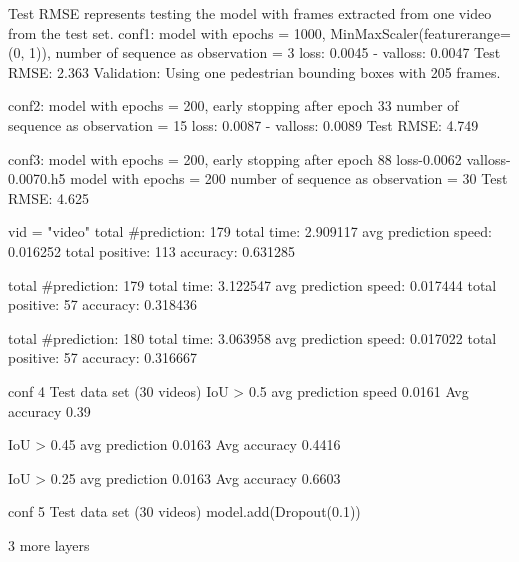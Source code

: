 Test RMSE represents testing the model with frames extracted from one video from the test set.
conf1: model with epochs = 1000, MinMaxScaler(feature\textunderscore range=(0, 1)), 
number of sequence as observation = 3
loss: 0.0045 - val\textunderscore loss: 0.0047 
Test RMSE: 2.363
Validation: Using one pedestrian bounding boxes with 205 frames.

conf2: 
model with epochs = 200, early stopping after epoch 33
number of sequence as observation = 15
loss: 0.0087 - val\textunderscore loss: 0.0089
Test RMSE: 4.749

conf3:
model with epochs = 200, early stopping after epoch 88
loss-0.0062 val\textunderscore loss-0.0070.h5
model with epochs = 200
number of sequence as observation = 30
Test RMSE: 4.625


vid = "video"
total \#prediction: 179
total time: 2.909117
avg prediction speed: 0.016252
total positive: 113
accuracy: 0.631285

total \#prediction: 179
total time: 3.122547
avg prediction speed: 0.017444
total positive: 57
accuracy: 0.318436

total \#prediction: 180
total time: 3.063958
avg prediction speed: 0.017022
total positive: 57
accuracy: 0.316667

conf 4 Test data set (30 videos)
IoU > 0.5
avg prediction speed 0.0161
Avg accuracy 0.39

IoU > 0.45
avg prediction 0.0163
Avg accuracy 0.4416

IoU > 0.25
avg prediction 0.0163
Avg accuracy 0.6603





conf 5 Test data set (30 videos)
model.add(Dropout(0.1))

3 more layers

